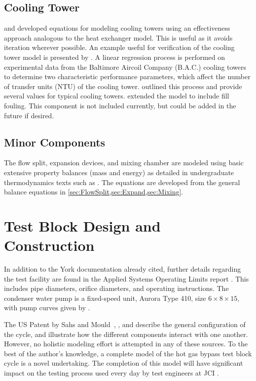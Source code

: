 \subsection{Cooling Tower}
\citet{braun1989} and \citet{mitchell2013} developed equations for modeling cooling towers 
using an effectiveness approach analogous to the heat exchanger model.
This is useful as it avoids iteration wherever possible. 
An example useful for verification of the cooling tower model 
is presented by \citet{mitchell2013}. 
A linear regression process is performed on experimental data from 
the Baltimore Aircoil Company (B.A.C.) cooling towers \citep{CLTselect} 
to determine two characteristic performance parameters, 
which affect the number of transfer units ($\mathrm{NTU}$) of the cooling tower. 
\citet{braun1989} outlined this process and provide several values 
for typical cooling towers. 
\citet{qureshi2006} extended the model to include fill fouling.
This component is not included currently, but could be added 
in the future if desired.

\subsection{Minor Components}
The flow split, expansion devices, and mixing chamber are modeled using 
basic extensive property balances (mass and energy) as detailed in 
undergraduate thermodynamics texts such as \citet{cengel2011}. 
The equations are developed from the general balance equations 
in \cref{sec:FlowSplit,sec:Expand,sec:Mixing}.

\section{Test Block Design and Construction}
In addition to the York documentation already cited, further details
regarding the test facility are found in the Applied Systems Operating Limits
report \citep{bluebook}. This includes pipe diameters, orifice diameters, and
operating instructions. The condenser water pump is a fixed-speed unit,
Aurora Type 410, size $6\times8\times15$, with pump curves given by
\citet{aurora2007}.

The US Patent by Sahs and Mould~\citep{sahs1956}, \citet{dirlea1996},
and \citet{mcgovern1984} describe the general configuration
of the cycle, and illustrate how the different components interact with one 
another.
However, no holistic modeling effort is attempted in any of these sources.
To the best of the author's knowledge, a complete model of the hot gas bypass
test block cycle is a novel undertaking.
The completion of this model will have significant impact on the testing process
used every day by test engineers at JCI \citep{sommer2013}.

